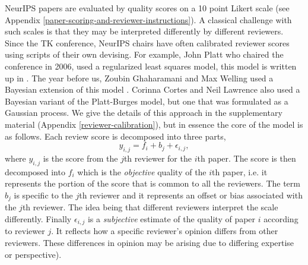\documentclass[twoside]{article}
\begin{document}
NeurIPS papers are evaluated by quality scores on a 10 point Likert scale (see Appendix \ref{paper-scoring-and-reviewer-instructions}). A classical challenge with such scales is that they may be interpreted differently by different reviewers. Since the TK conference, NeurIPS chairs have often calibrated reviewer scores using scripts of their own devising. For example, John Platt who chaired the conference in 2006, used a regularized least squares model, this model is written up in \cite{Platt-calibration12}. The year before us, Zoubin Ghaharamani and Max Welling used a Bayesian extension of this model \cite{Ge-bayesian15}. Corinna Cortes and Neil Lawrence also used a Bayesian variant of the Platt-Burges model, but one that was formulated as a Gaussian process. We give the details of this approach in the supplementary material (Appendix \ref{reviewer-calibration}), but in essence the core of the model is as follows. Each review score is decomposed into three parts,
$$
y_{i,j} = f_i + b_j + \epsilon_{i, j},
$$
where $y_{i,j}$ is the score from the $j$th reviewer for the $i$th paper. The score is then decomposed into $f_i$ which is the \emph{objective} quality of the $i$th paper, i.e. it represents the portion of the score that is common to all the reviewers. The term $b_j$ is specific to the $j$th reviewer and it represents an offset or bias associated with the $j$th reviewer. The idea being that different reviewers interpret the scale differently. Finally $\epsilon_{i,j}$ is a \emph{subjective} estimate of the quality of paper $i$ according to reviewer $j$. It reflects how a specific reviewer's
opinion differs from other reviewers. These differences in opinion may be arising due to differing expertise or perspective).
\end{document}
